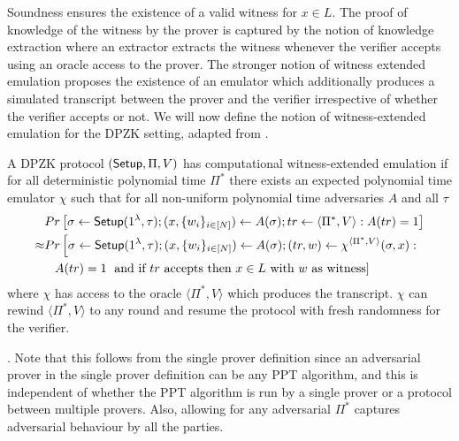 Soundness ensures the existence of a valid witness for $x \in L$. The proof of knowledge of the witness by the prover is captured by the notion of knowledge extraction where an extractor extracts the witness whenever the verifier accepts using an oracle access to the prover. The stronger notion of witness extended emulation \cite{Lindell03} proposes the existence of an emulator which additionally produces a simulated transcript between the prover and the verifier irrespective of whether the verifier accepts or not. We will now define the notion of witness-extended emulation for the DPZK setting, adapted from \cite{Groth11}. 
\begin{definition}
A DPZK protocol $(\mathsf{Setup}, \Pi, V)$ has computational witness-extended emulation if for all deterministic polynomial time $\Pi^*$ there exists  an expected polynomial time emulator $\chi$ such that for all non-uniform polynomial time adversaries $A$ and all $\tau$
\begin{align*}
&Pr \left[\sigma \leftarrow \mathsf{Setup}(1^{\lambda}, \tau); (x, \{w_i\}_{i \in [N]}) \leftarrow A(\sigma); tr \leftarrow \langle \Pi^*, V \rangle: A(tr) = 1 \right] \\
\approx &Pr \left[\sigma \leftarrow \mathsf{Setup}(1^{\lambda}, \tau); (x, \{w_i\}_{i \in [N]}) \leftarrow A(\sigma); (tr, w) \leftarrow \chi^{\langle \Pi^*, V \rangle}(\sigma, x): \right. \\
&\;\;\; A(tr) = 1 \left. \text{ and if } tr \text{ accepts then } x \in L \text{ with } w \text{ as witness} \right] 
\end{align*}
where $\chi$ has access to the oracle $\langle \Pi^*, V \rangle$ which produces the transcript. $\chi$ can rewind $\langle \Pi^*, V \rangle$ to any round and resume the protocol with fresh randomness for the verifier.
\end{definition}
.
Note that this follows from the single prover definition since an adversarial prover in the single prover definition can be any PPT algorithm, and this is independent of whether the PPT algorithm is run by a single prover or a protocol between multiple provers.
Also, allowing for any adversarial $\Pi^*$ captures adversarial behaviour by all the parties.

